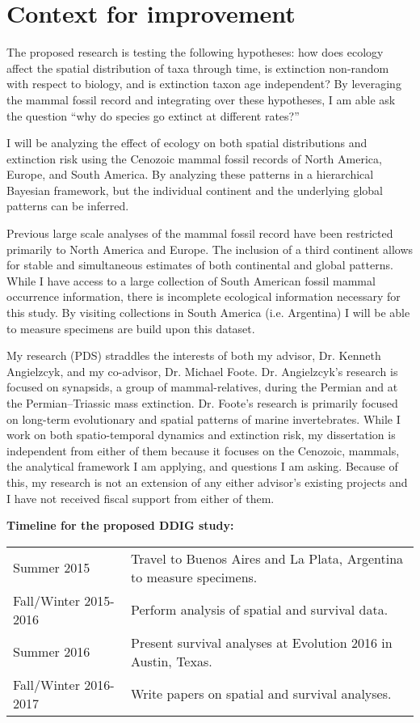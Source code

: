 \documentclass[11pt,letterpaper]{article}
\begin{document}
\setcounter{secnumdepth}{0}
\section{Context for improvement}

The proposed research is testing the following hypotheses: how does ecology affect the spatial distribution of taxa through time, is extinction non-random with respect to biology, and is extinction taxon age independent? By leveraging the mammal fossil record and integrating over these hypotheses, I am able ask the question ``why do species go extinct at different rates?'' 

I will be analyzing the effect of ecology on both spatial distributions and extinction risk using the Cenozoic mammal fossil records of North America, Europe, and South America. By analyzing these patterns in a hierarchical Bayesian framework, but the individual continent and the underlying global patterns can be inferred.

Previous large scale analyses of the mammal fossil record have been restricted primarily to North America and Europe. The inclusion of a third continent allows for stable and simultaneous estimates of both continental and global patterns. While I have access to a large collection of South American fossil mammal occurrence information, there is incomplete ecological information necessary for this study. By visiting collections in South America (i.e. Argentina) I will be able to measure specimens are build upon this dataset. 

My research (PDS) straddles the interests of both my advisor, Dr. Kenneth Angielzcyk, and my co-advisor, Dr. Michael Foote. Dr. Angielzcyk's research is focused on synapsids, a group of mammal-relatives, during the Permian and at the Permian--Triassic mass extinction. Dr. Foote's research is primarily focused on long-term evolutionary and spatial patterns of marine invertebrates. While I work on both spatio-temporal dynamics and extinction risk, my dissertation is independent from either of them because it focuses on the Cenozoic, mammals, the analytical framework I am applying, and questions I am asking. Because of this, my research is not an extension of any either advisor's existing projects and I have not received fiscal support from either of them.


\textbf{Timeline for the proposed DDIG study:}

\begin{tabular}[H]{l l}
  Summer 2015 & Travel to Buenos Aires and La Plata, Argentina to measure specimens. \\
  Fall/Winter 2015-2016 & Perform analysis of spatial and survival data. \\
  Summer 2016 & Present survival analyses at Evolution 2016 in Austin, Texas. \\
  Fall/Winter 2016-2017 & Write papers on spatial and survival analyses. \\
\end{tabular}
\end{document}
